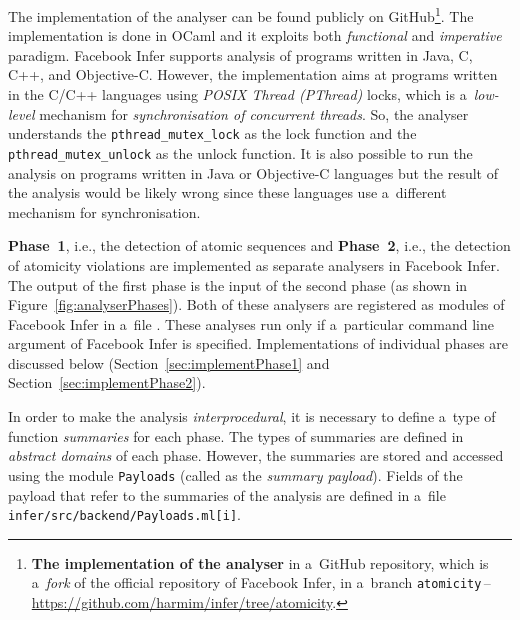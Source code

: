 The implementation of the analyser can be found publicly on
GitHub\footnote{\textbf{The implementation of the analyser} in a~GitHub
repository, which is a~\emph{fork} of the official repository of Facebook
Infer, in a~branch
\texttt{atomicity}\,--\,\url{https://github.com/harmim/infer/tree/atomicity}.}.
The implementation is done in OCaml and it exploits both \emph{functional}
and \emph{imperative} paradigm. Facebook Infer supports analysis of
programs written in Java, C, C++, and Objective-C. However, the implementation
aims at programs written in the C/C++ languages using \emph{POSIX Thread
(PThread)} locks, which is a~\emph{low-level} mechanism for
\emph{synchronisation of concurrent threads}. So, the analyser understands 
the \texttt{pthread\_mutex\_lock} as the lock function and the
\texttt{pthread\_mutex\_unlock} as the unlock function. It is also possible 
to run the analysis on programs written in Java or Objective-C languages but
the result of the analysis would be likely wrong since these languages use
a~different mechanism for synchronisation.

\textbf{Phase~1}, i.e., the detection of atomic sequences and \textbf{Phase~2},
i.e., the detection of atomicity violations are implemented as separate
analysers in Facebook Infer. The output of the first phase is the input of
the second phase (as shown in Figure~\ref{fig:analyserPhases}). Both of
these analysers are registered as modules of Facebook Infer in a~file
. These analyses run only
if a~particular command line argument of Facebook Infer is specified.
Implementations of individual phases are discussed below
(Section~\ref{sec:implementPhase1} and Section~\ref{sec:implementPhase2}).

In order to make the analysis \emph{interprocedural}, it is necessary to
define a~type of function \emph{summaries} for each phase.
The types of summaries are defined in \emph{abstract domains} of
each phase. However, the summaries are stored and accessed using
the module \texttt{Payloads} (called as the \emph{summary payload}). 
Fields of the payload that refer to the summaries of the analysis are 
defined in a~file \texttt{infer/src/backend/Payloads.ml[i]}.

